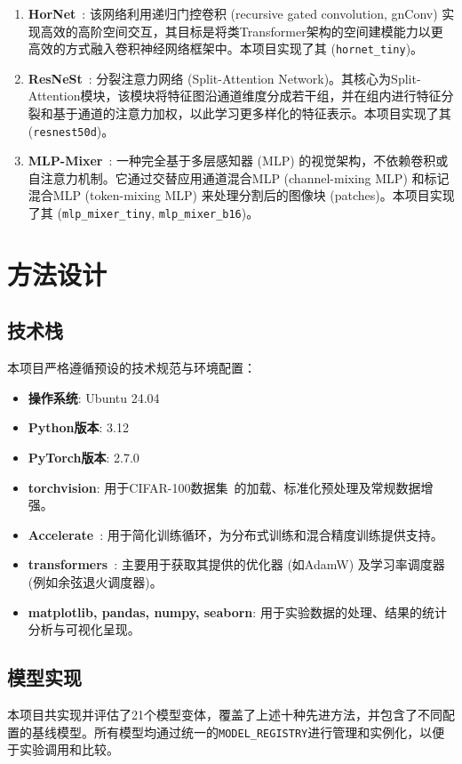 \documentclass[a4paper]{article}
\begin{document}
\begin{enumerate}
    \item \textbf{HorNet}~\cite{rao2022hornet}: 该网络利用递归门控卷积 (recursive gated convolution, gnConv) 实现高效的高阶空间交互，其目标是将类Transformer架构的空间建模能力以更高效的方式融入卷积神经网络框架中。本项目实现了其 (\texttt{hornet\_tiny})。
    
    \item \textbf{ResNeSt}~\cite{zhang2022resnest}: 分裂注意力网络 (Split-Attention Network)。其核心为Split-Attention模块，该模块将特征图沿通道维度分成若干组，并在组内进行特征分裂和基于通道的注意力加权，以此学习更多样化的特征表示。本项目实现了其 (\texttt{resnest50d})。
    
    \item \textbf{MLP-Mixer}~\cite{tolstikhin2021mlp}: 一种完全基于多层感知器 (MLP) 的视觉架构，不依赖卷积或自注意力机制。它通过交替应用通道混合MLP (channel-mixing MLP) 和标记混合MLP (token-mixing MLP) 来处理分割后的图像块 (patches)。本项目实现了其 (\texttt{mlp\_mixer\_tiny}, \texttt{mlp\_mixer\_b16})。
\end{enumerate}

\section{方法设计}
\subsection{技术栈}
本项目严格遵循预设的技术规范与环境配置：
\begin{itemize}
    \item \textbf{操作系统}: Ubuntu 24.04
    \item \textbf{Python版本}: 3.12
    \item \textbf{PyTorch版本}: 2.7.0~\cite{paszke2019pytorch}
    \item \textbf{torchvision}: 用于CIFAR-100数据集~\cite{krizhevsky2009learning}的加载、标准化预处理及常规数据增强。
    \item \textbf{Accelerate}~\cite{huggingfaceaccelerate}: 用于简化训练循环，为分布式训练和混合精度训练提供支持。
    \item \textbf{transformers}~\cite{wolf2020transformers}: 主要用于获取其提供的优化器 (如AdamW) 及学习率调度器 (例如余弦退火调度器)。
    \item \textbf{matplotlib, pandas, numpy, seaborn}: 用于实验数据的处理、结果的统计分析与可视化呈现。
\end{itemize}

\subsection{模型实现}
本项目共实现并评估了21个模型变体，覆盖了上述十种先进方法，并包含了不同配置的基线模型。所有模型均通过统一的\texttt{MODEL\_REGISTRY}进行管理和实例化，以便于实验调用和比较。
\end{document}
